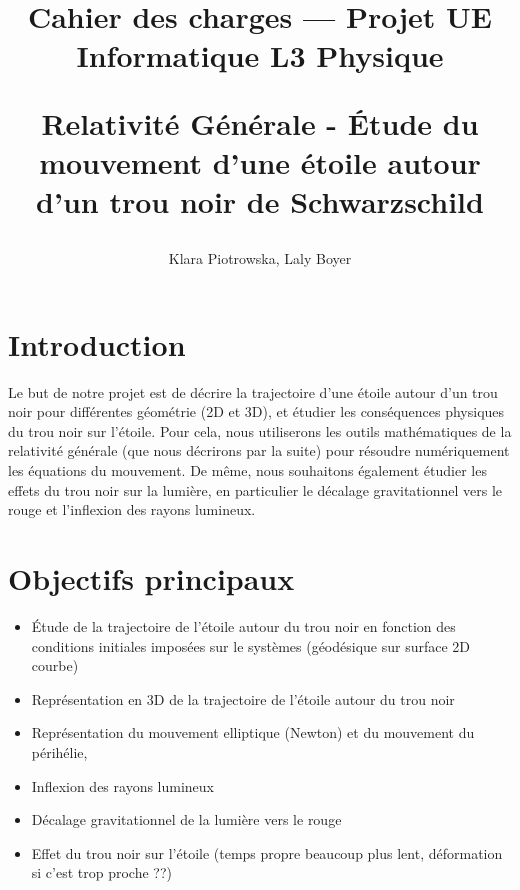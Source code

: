 \documentclass{article}
\title{{Cahier des charges — Projet UE Informatique L3 Physique}\vspace{2em}
\begin{large} Relativité Générale - Étude du mouvement d'une étoile autour d'un trou noir de Schwarzschild
\end{large} }
\author{Klara Piotrowska, Laly Boyer}
\begin{document}
\maketitle
\tableofcontents

\newpage

\section{Introduction}


Le but de notre projet est de décrire la trajectoire d’une étoile autour d’un trou noir pour différentes géométrie (2D et 3D), et étudier les conséquences physiques du trou noir sur l'étoile. Pour cela, nous utiliserons les outils mathématiques de la relativité générale (que nous décrirons par la suite) pour résoudre numériquement les équations du mouvement. 
De même, nous souhaitons également étudier les effets du trou noir sur la lumière, en particulier le décalage gravitationnel vers le rouge et l’inflexion des rayons lumineux.


\section{Objectifs principaux} 
\begin{itemize}[label=\textendash]
    \item Étude de la trajectoire de l’étoile autour du trou noir en fonction des conditions initiales imposées sur le systèmes (géodésique sur surface 2D courbe)
    \item  Représentation en 3D de la trajectoire de l’étoile autour du trou noir
    \item Représentation du mouvement elliptique (Newton) et du mouvement du périhélie, 
    \item Inflexion des rayons lumineux
    \item Décalage gravitationnel de la lumière vers le rouge 
    \item Effet du trou noir sur l’étoile (temps propre beaucoup plus lent, déformation si c’est trop proche ??)
\end{itemize}
\end{document}
